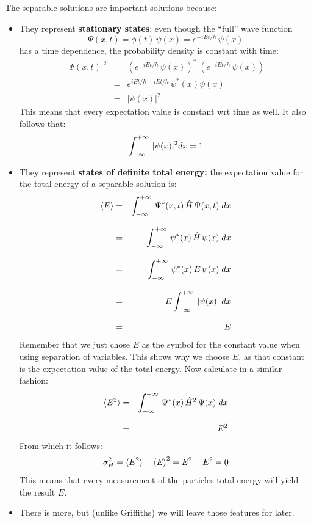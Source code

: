 \documentclass[12pt]{book}
\begin{document}
\noindent
The separable solutions are important solutions because:
\begin{itemize}
\item They represent {\bf stationary states}:  even though the ``full'' wave function
\begin{equation*}
\Psi(x,t) = \phi(t) \, \psi(x) = e^{-iEt/h} \, \psi(x)
\end{equation*}
has a time dependence, the probability density is constant with time:
\begin{eqnarray*}
|\Psi(x,t)|^2 &=& \left(e^{-iEt/h} \, \psi(x)\right)^* \; \left(e^{-iEt/h} \, \psi(x)\right)\\[8pt]
&=& e^{iEt/h-iEt/h} \, \psi^*(x) \psi(x)\\[8pt]
&=& | \psi(x) |^2
\end{eqnarray*}
This means that every expectation value is constant wrt time as well.  It also follows that:
\begin{equation*}
\int_{-\infty}^{+\infty}\, |\psi(x)|^2 dx = 1\\
\end{equation*}


\item They represent {\bf states of definite total energy:} the expectation value for the total energy of a separable solution is:
\begin{eqnarray*}
\braket{E} &=& \int_{-\infty}^{+\infty}\, \Psi^*(x,t) \, \hat{H} \, \Psi(x,t) \; dx \\[8pt]
           &=& \int_{-\infty}^{+\infty}\, \psi^*(x) \, \hat{H} \, \psi(x) \; dx \\[8pt]
           &=& \int_{-\infty}^{+\infty}\, \psi^*(x) \, E \, \psi(x) \; dx \\[8pt]
           &=& E \int_{-\infty}^{+\infty}\, |\psi(x)| \; dx \\[8pt]
           &=& E           
\end{eqnarray*}
Remember that we just chose $E$ as the symbol for the constant value when using separation of variables.  This shows why we choose $E$, as that constant is the expectation value of the total energy.  Now calculate in a similar fashion:
\begin{eqnarray*}
\braket{E^2} &=& \int_{-\infty}^{+\infty}\, \Psi^*(x) \, \hat{H}^2 \, \Psi(x) \; dx \\[8pt]
           &=& E^2
\end{eqnarray*}
From which it follows:
\begin{equation*}
\sigma^2_H = \braket{E^2} - \braket{E}^2 = E^2 - E^2 = 0
\end{equation*}
This means that every measurement of the particles total energy will yield the result $E$.
\item There is more, but (unlike Griffiths) we will leave those features for later.
\end{itemize}
\end{document}
